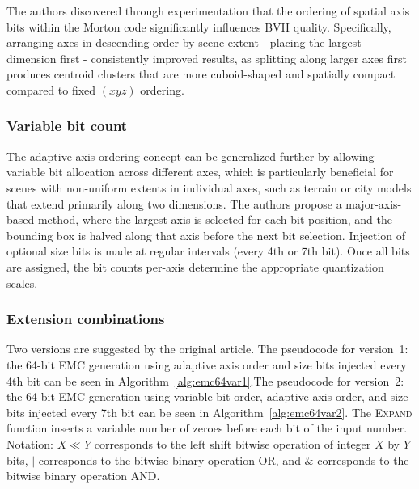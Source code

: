 The authors discovered through experimentation that the ordering of spatial axis bits within the Morton code significantly influences BVH quality. Specifically, arranging axes in descending order by scene extent - placing the largest dimension first - consistently improved results, as splitting along larger axes first produces centroid clusters that are more cuboid-shaped and spatially compact compared to fixed $(xyz)$ ordering. \cite{Vinkler2017}

\subsubsection{Variable bit count}

The adaptive axis ordering concept can be generalized further by allowing variable bit allocation across different axes, which is particularly beneficial for scenes with non-uniform extents in individual axes, such as terrain or city models that extend primarily along two dimensions. The authors propose a major-axis-based method, where the largest axis is selected for each bit position, and the bounding box is halved along that axis before the next bit selection. Injection of optional size bits is made at regular intervals (every 4th or 7th bit). Once all bits are assigned, the bit counts per-axis determine the appropriate quantization scales. \cite{Vinkler2017}

\subsubsection{Extension combinations}

Two versions are suggested by the original article. The pseudocode for version~1: the 64-bit EMC generation using adaptive axis order and size bits injected every 4th bit can be seen in Algorithm~\ref{alg:emc64var1}.The pseudocode for version~2: the 64-bit EMC generation using variable bit order, adaptive axis order, and size bits injected every 7th bit can be seen in Algorithm~\ref{alg:emc64var2}. The \textsc{Expand} function inserts a variable number of zeroes before each bit of the input number. Notation: $X \ll Y$ corresponds to the left shift bitwise operation of integer $X$ by $Y$ bits, $\mid$ corresponds to the bitwise binary operation OR, and $\&$ corresponds to the bitwise binary operation AND. \cite{Vinkler2017}


